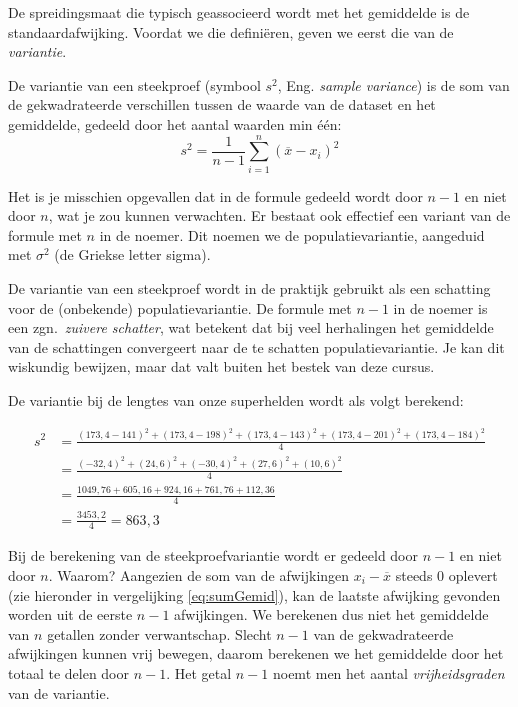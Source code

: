 De spreidingsmaat die typisch geassocieerd wordt met het gemiddelde is de standaardafwijking. Voordat we die definiëren, geven we eerst die van de \emph{variantie}.

\begin{definition}[Variantie]
  De  variantie van een steekproef (symbool $s^{2}$, Eng. \emph{sample variance}) is de som van de gekwadrateerde verschillen tussen de waarde van de dataset en het gemiddelde, gedeeld door het aantal waarden min één:
  \begin{equation}
  s^{2} = \frac{1}{n-1} \sum_{i=1}^{n} \left(\overline{x} - x_i \right)^{2}
  \label{eq:variantie}
  \end{equation}
\end{definition}

Het is je misschien opgevallen dat in de formule gedeeld wordt door $n-1$ en niet door $n$, wat je zou kunnen verwachten. Er bestaat ook effectief een variant van de formule met $n$ in de noemer. Dit noemen we de populatievariantie, aangeduid met $\sigma^2$ (de Griekse letter sigma).

De variantie van een steekproef wordt in de praktijk gebruikt als een schatting voor de (onbekende) populatievariantie. De formule met $n-1$ in de noemer is een zgn.~\textit{zuivere schatter}, wat betekent dat bij veel herhalingen het gemiddelde van de schattingen convergeert naar de te schatten populatievariantie. Je kan dit wiskundig bewijzen, maar dat valt buiten het bestek van deze cursus.

\begin{example}
  De variantie bij de lengtes van onze superhelden wordt als volgt berekend:
  
  \begin{align*}
  	s^{2} & =  \frac{(173,4 - 141)^{2} + (173,4 - 198 )^{2} + (173,4 - 143)^{2} + (173,4 - 201)^{2} + (173,4 - 184 )^{2}}{4} \\
  	      & =  \frac{(-32,4)^{2} + (24,6)^{2} + (-30,4)^{2} + (27,6)^{2} + (10,6)^{2}}{4}                                    \\
  	      & = \frac{1049,76 + 605,16 + 924,16 + 761,76 + 112,36}{4}                                                          \\
  	      & = \frac{3453,2}{4} = 863,3
  \end{align*}
\end{example}

Bij de berekening van de steekproefvariantie wordt er gedeeld door $n-1$ en niet door $n$. Waarom? Aangezien de som van de afwijkingen $x_{i} - \overline{x}$ steeds 0 oplevert (zie hieronder in vergelijking \ref{eq:sumGemid}), kan de laatste afwijking gevonden worden uit de eerste $n-1$ afwijkingen. We berekenen dus niet het gemiddelde van $n$ getallen zonder verwantschap. Slecht $n-1$ van de gekwadrateerde afwijkingen kunnen vrij bewegen, daarom berekenen we het gemiddelde door het totaal te delen door $n-1$. Het getal $n-1$ noemt men het aantal \emph{vrijheidsgraden} van de variantie.


